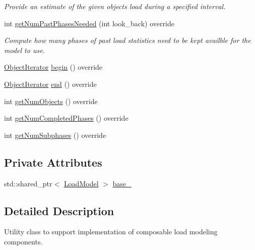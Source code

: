 \begin{DoxyCompactItemize}
\begin{DoxyCompactList}\small\item\em Provide an estimate of the given object\textquotesingle{}s load during a specified interval. \end{DoxyCompactList}\item 
int \hyperlink{classvt_1_1vrt_1_1collection_1_1balance_1_1_composed_model_a1fb8c98e3500be582095a54369661316}{get\+Num\+Past\+Phases\+Needed} (int look\+\_\+back) override
\begin{DoxyCompactList}\small\item\em Compute how many phases of past load statistics need to be kept availble for the model to use. \end{DoxyCompactList}\item 
\hyperlink{classvt_1_1vrt_1_1collection_1_1balance_1_1_object_iterator}{Object\+Iterator} \hyperlink{classvt_1_1vrt_1_1collection_1_1balance_1_1_composed_model_a8f34205887c08a22a1e5bef6ee358f2b}{begin} () override
\item 
\hyperlink{classvt_1_1vrt_1_1collection_1_1balance_1_1_object_iterator}{Object\+Iterator} \hyperlink{classvt_1_1vrt_1_1collection_1_1balance_1_1_composed_model_a23ca95221c6bffb7417aafa2c939b40a}{end} () override
\item 
int \hyperlink{classvt_1_1vrt_1_1collection_1_1balance_1_1_composed_model_a7b383954706cb8069e841a87c3ff3f8f}{get\+Num\+Objects} () override
\item 
int \hyperlink{classvt_1_1vrt_1_1collection_1_1balance_1_1_composed_model_a20736b80cf2b19d1a9352363b48039e0}{get\+Num\+Completed\+Phases} () override
\item 
int \hyperlink{classvt_1_1vrt_1_1collection_1_1balance_1_1_composed_model_af3ea09828c281d9c278198a19fe4e533}{get\+Num\+Subphases} () override
\end{DoxyCompactItemize}
\subsection*{Private Attributes}
\begin{DoxyCompactItemize}
\item 
std\+::shared\+\_\+ptr$<$ \hyperlink{classvt_1_1vrt_1_1collection_1_1balance_1_1_load_model}{Load\+Model} $>$ \hyperlink{classvt_1_1vrt_1_1collection_1_1balance_1_1_composed_model_a8a2a6b2d5e79a7c02002132913c9ae55}{base\+\_\+}
\end{DoxyCompactItemize}


\subsection{Detailed Description}
Utility class to support implementation of composable load modeling components. 


